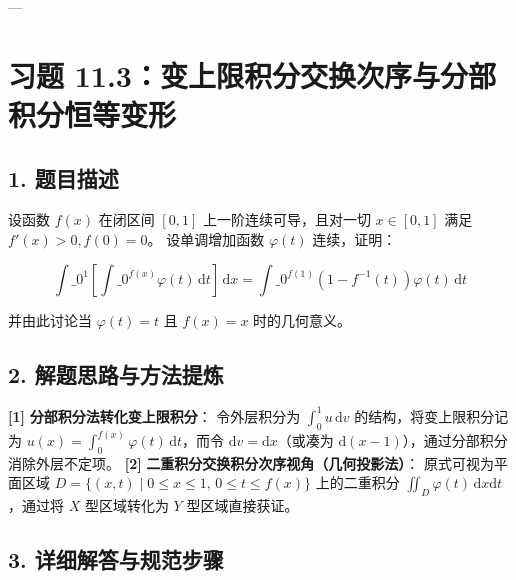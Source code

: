 \documentclass[11pt,a4paper,UTF8]{ctexart}
\begin{document}
---


\section{习题 11.3：变上限积分交换次序与分部积分恒等变形}


\subsection{1. 题目描述}
设函数 $f(x)$ 在闭区间 $[0, 1]$ 上一阶连续可导，且对一切 $x \in [0, 1]$ 满足 $f'(x) > 0, f(0) = 0$。
设单调增加函数 $\varphi(t)$ 连续，证明：

\begin{equation*}
\int\_0^1 \left[ \int\_0^{f(x)} \varphi(t)\,\mathrm{d}t \right]\,\mathrm{d}x = \int\_0^{f(1)} (1 - f^{-1}(t))\varphi(t)\,\mathrm{d}t
\end{equation*}

并由此讨论当 $\varphi(t) = t$ 且 $f(x) = x$ 时的几何意义。


\subsection{2. 解题思路与方法提炼}
\begin{solbox}[分步推导与答题规范]
\textbf{[1]}  \textbf{分部积分法转化变上限积分}：
令外层积分为 $\int_0^1 u\,\mathrm{d}v$ 的结构，将变上限积分记为 $u(x) = \int_0^{f(x)}\varphi(t)\,\mathrm{d}t$，而令 $\mathrm{d}v = \mathrm{d}x$（或凑为 $\mathrm{d}(x-1)$），通过分部积分消除外层不定项。
\textbf{[2]}  \textbf{二重积分交换积分次序视角（几何投影法）}：
原式可视为平面区域 $D = \{(x, t) \mid 0 \le x \le 1,\, 0 \le t \le f(x)\}$ 上的二重积分 $\iint_D \varphi(t)\,\mathrm{d}x\mathrm{d}t$，通过将 $X$ 型区域转化为 $Y$ 型区域直接获证。
\end{solbox}


\subsection{3. 详细解答与规范步骤}
\end{document}
